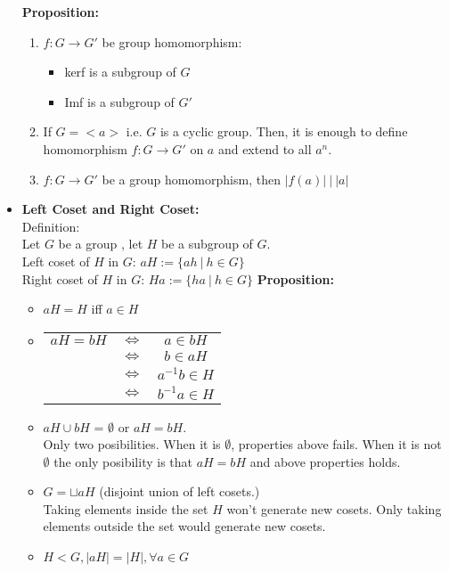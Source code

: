 \documentclass[12pt]{article}
\newcommand{\defi}{{\color{blue} Definition: $\ $}}
\begin{document}
\begin{itemize}
\begin{enumerate}
        \end{enumerate}
        \textbf{Proposition:}
        \begin{enumerate}
            \item $f: G \rightarrow G'$ be group homomorphism:
            \begin{itemize}
                \item kerf is a subgroup of $G$
                \item Imf is a subgroup of $G'$
            \end{itemize}
            \item If $G = <a>$ i.e. $G$ is a cyclic group. Then, it is enough to define homomorphism $f:G\rightarrow G'$ on $a$ and extend to all $a^n$.
            \item $f: G\rightarrow G'$ be a group homomorphism, then $|f(a)| \ | \ |a|$
        \end{enumerate}
        \item \textbf{Left Coset and Right Coset:}\\
        \defi \\
        Let $G$ be a group , let $H$ be a subgroup of $G$.\\
        Left coset of $H$ in $G$: $aH := \{ah \ | \ h \in G\}$\\
        Right coset of $H$ in $G$: $Ha := \{ha \ | \ h \in G\}$
        \textbf{Proposition:}
        \begin{itemize}
            \item $aH = H$ iff $a \in H$
            \item \begin{tabular}{ccc}
                $aH = bH$ & $\Leftrightarrow$ & $a\in bH$ \\
                  & $\Leftrightarrow$ & $b\in aH$ \\
                  & $\Leftrightarrow$ & $a^{-1}b\in H$ \\
                  & $\Leftrightarrow$ & $b^{-1}a\in H$
            \end{tabular}
            \item $aH \cup bH$ = $\emptyset$ or $aH = bH$.\\
            Only two posibilities. When it is $\emptyset$, properties above fails. When it is not $\emptyset$ the only posibility is that $aH = bH$ and above properties holds.
            \item $G = \sqcup aH$ (disjoint union of left cosets.)\\
            Taking elements inside the set $H$ won't generate new cosets. Only taking elements outside the set would generate new cosets.
            \item $H < G, |aH| = |H|, \forall a \in G$
        \end{itemize}
        

\end{itemize}
\end{document}
